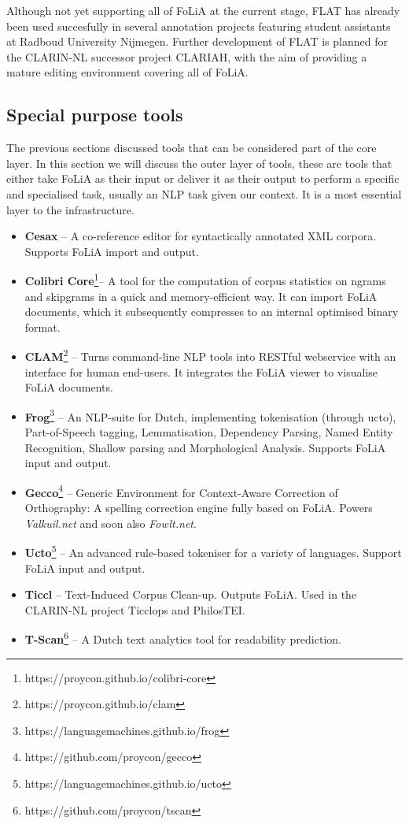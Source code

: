 \documentclass[a4paper,10pt,twoside]{article}
\begin{document}
Although not yet supporting all of FoLiA at the current stage, FLAT has already
been used succesfully in several annotation projects featuring student
assistants at Radboud University Nijmegen. Further development of FLAT is
planned for the CLARIN-NL successor project CLARIAH, with the aim of providing
a mature editing environment covering all of FoLiA.

\subsection{Special purpose tools}

The previous sections discussed tools that can be considered part of the
core layer. In this section we will discuss the outer layer of tools, these are
tools that either take FoLiA as their input or deliver it as their output to
perform a specific and specialised task, usually an NLP task given our context.
It is a most essential layer to the infrastructure.

\begin{itemize}
\item \textbf{Cesax} -- A co-reference editor for syntactically annotated XML corpora.
    Supports FoLiA import and output.\cite{CESAX} 
\item \textbf{Colibri Core}\footnote{https://proycon.github.io/colibri-core}-- A tool for the computation
    of corpus statistics on ngrams and skipgrams in a quick and
    memory-efficient way. It can import FoLiA documents, which it subsequently
    compresses to an internal optimised binary format.
\item \textbf{CLAM}\footnote{https://proycon.github.io/clam} -- Turns command-line NLP tools into RESTful webservice with an
    interface for human end-users. It integrates the FoLiA viewer to visualise
    FoLiA documents.\cite{CLAM}
\item \textbf{Frog}\footnote{https://languagemachines.github.io/frog} -- An NLP-suite for Dutch, implementing tokenisation (through
    ucto), Part-of-Speech tagging, Lemmatisation, Dependency Parsing, Named
    Entity Recognition, Shallow parsing and Morphological Analysis. Supports
    FoLiA input and output.
\item \textbf{Gecco}\footnote{https://github.com/proycon/gecco}  -- Generic Environment for Context-Aware Correction
    of Orthography: A spelling correction engine fully based on FoLiA. Powers
    \emph{Valkuil.net} and soon also \emph{Fowlt.net}.
\item \textbf{Ucto}\footnote{https://languagemachines.github.io/ucto} -- An advanced rule-based tokeniser for a variety of
    languages. Support FoLiA
    input and output.\cite{UCTO}
\item \textbf{Ticcl} -- Text-Induced Corpus Clean-up. Outputs FoLiA. Used in the
    CLARIN-NL project Ticclops and PhilosTEI.\cite{TICCL}
\item \textbf{T-Scan}\footnote{https://github.com/proycon/tscan} -- A Dutch text analytics tool for readability
    prediction.\cite{TSCAN}
\end{itemize}
\end{document}
